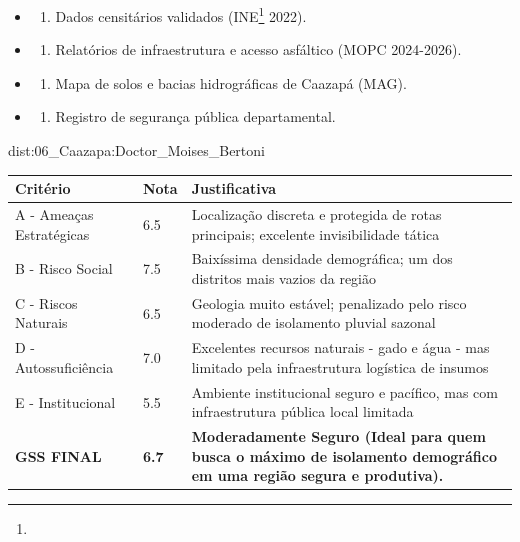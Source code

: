{\begin{itemize}
\tightlist
\item
  \begin{enumerate}
  \def\labelenumi{\arabic{enumi})}
  \tightlist
  \item
    Dados censitários validados (INE\footnote{\fineINE} 2022).
  \end{enumerate}
\item
  \begin{enumerate}
  \def\labelenumi{\arabic{enumi})}
  \setcounter{enumi}{1}
  \tightlist
  \item
    Relatórios de infraestrutura e acesso asfáltico (MOPC 2024-2026).
  \end{enumerate}
\item
  \begin{enumerate}
  \def\labelenumi{\arabic{enumi})}
  \setcounter{enumi}{2}
  \tightlist
  \item
    Mapa de solos e bacias hidrográficas de Caazapá (MAG).
  \end{enumerate}
\item
  \begin{enumerate}
  \def\labelenumi{\arabic{enumi})}
  \setcounter{enumi}{3}
  \tightlist
  \item
    Registro de segurança pública departamental.
  \end{enumerate}
\end{itemize}}{dist:06_Caazapa:Doctor_Moises_Bertoni}
\begin{table}[ht!]
\small \begin{tabular}{p{3.0cm}p{0.8cm}p{6.0cm}} \toprule
\textbf{Critério} & \textbf{Nota} & \textbf{Justificativa} \\ \midrule
A - Ameaças Estratégicas & 6.5 & Localização discreta e protegida de rotas principais; excelente invisibilidade tática \\
B - Risco Social & 7.5 & Baixíssima densidade demográfica; um dos distritos mais vazios da região \\
C - Riscos Naturais & 6.5 & Geologia muito estável; penalizado pelo risco moderado de isolamento pluvial sazonal \\
D - Autossuficiência & 7.0 & Excelentes recursos naturais - gado e água - mas limitado pela infraestrutura logística de insumos \\
E - Institucional & 5.5 & Ambiente institucional seguro e pacífico, mas com infraestrutura pública local limitada \\
\midrule \textbf{GSS FINAL} & \textbf{6.7} & \textbf{Moderadamente Seguro (Ideal para quem busca o máximo de isolamento demográfico em uma região segura e produtiva).} \\ \bottomrule \end{tabular}
\end{table}
